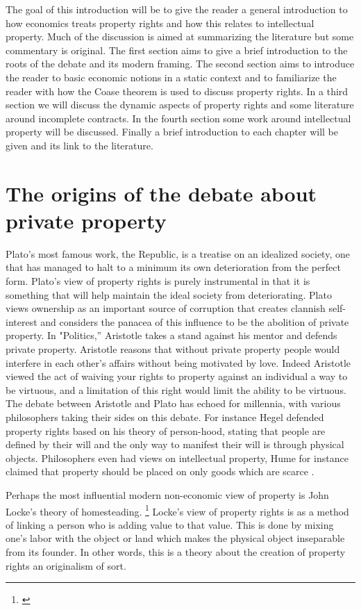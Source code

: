 \documentclass[12pt]{article}
\numberwithin{equation}{section}
\begin{document}
The goal of this introduction will be to give the reader a general introduction to how economics treats property rights and how this relates to intellectual property. Much of the discussion is aimed at summarizing the literature but some commentary is original. The first section aims to give a brief introduction to the roots of the debate and its modern framing. The second section aims to introduce the reader to basic economic notions in a static context and to familiarize the reader with how the Coase theorem is used to discuss property rights. In a third section we will discuss the dynamic aspects of property rights and some literature around incomplete contracts. In the fourth section some work around intellectual property will be discussed. Finally a brief introduction to each chapter will be given and its link to the literature.


\section{The origins of the debate about private property}

Plato's most famous work, the Republic, is a treatise on an idealized society, one that has managed to halt to a minimum its own deterioration from the perfect form. Plato's view of property rights is purely instrumental in that it is something that will help maintain the ideal society from deteriorating. Plato views ownership as an important source of corruption that creates clannish self-interest and considers the panacea of this influence to be the abolition of private property.
In "Politics,'' Aristotle takes a stand against his mentor and defends private property. Aristotle reasons that without private property people would interfere in each other’s affairs without being motivated by love. Indeed Aristotle viewed the act of waiving your rights to property against an individual a way to be virtuous, and a limitation of this right would limit the ability to be virtuous. The debate between Aristotle and Plato has echoed for millennia, with various philosophers taking their sides on this debate. For instance Hegel defended property rights based on his theory of person-hood, stating that people are defined by their will and the only way to manifest their will is through physical objects. Philosophers even had views on intellectual property, Hume for instance claimed that property should be placed on only goods which are scarce \cite{plant1934economic}.

Perhaps the most influential modern non-economic view of property is John Locke's theory of homesteading. \footnote{\cite{locke2014second}} Locke's view of property rights is as a method of linking a person who is adding value to that value. This is done by mixing one's labor with the object or land which makes the physical object inseparable from its founder. In other words, this is a theory about the creation of property rights an originalism of sort.
\end{document}
